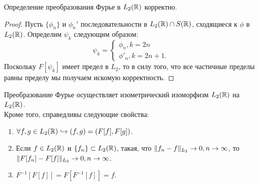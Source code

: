 \begin{theorem}
    Определение преобразования Фурье в $L_2(\mathbb{R})$ корректно.
\end{theorem}
\begin{proof}
    Пусть $\{\phi_n\}$ и $\phi_n'$ последовательности в $L_2(\mathbb{R}) \cap S(\mathbb{R})$, сходящиеся к $\phi$ в $L_2(\mathbb{R})$.
    Определим $\psi_k$ следующим образом:
    \[
        \psi_k = \begin{cases}
                     \phi_n, k = 2n \\
                     \phi'_n, k = 2n + 1.
        \end{cases}
    \]
    Поскольку $F[\psi_k]$ имеет предел в $L_2$, то в силу того, что все частичные пределы равны пределу мы получаем искомую корректность.
\end{proof}
\begin{theorem}
    Преобразование Фурье осуществляет изометрический изоморфизм $L_2(\mathbb{R})$ на $L_2(\mathbb{R})$. \\
    Кроме того, справедливы следующие свойства:
    \begin{enumerate}
        \item $\forall f, g \in L_2(\mathbb{R}) \hookrightarrow (f, g) = (F[f], F[g])$.
        \item Если $f \in L_2(\mathbb{R})$ и $\{f_n\} \subset L_2(\mathbb{R})$, такая, что $\|f_n - f\|_{L_2} \rightarrow 0, n \rightarrow \infty$, то $\|F[f_n] - F[f]\|_{L_2} \rightarrow 0, n \rightarrow \infty$.
        \item $F^{-1}[F[f]] = F[F^{-1}[f]] = f$.
    \end{enumerate}
\end{theorem}
